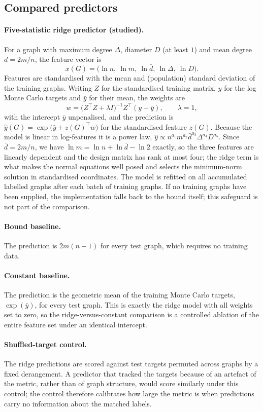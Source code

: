 \documentclass{article}
\begin{document}
\subsection{Compared predictors}
\paragraph{Five-statistic ridge predictor (studied).} For a graph with maximum degree $\Delta$, diameter $D$ (at least $1$) and mean degree $\bar d=2m/n$, the feature vector is
\[
x(G)=\big(\ln n,\ \ln m,\ \ln \bar d,\ \ln\Delta,\ \ln D\big).
\]
Features are standardised with the mean and (population) standard deviation of the training graphs. Writing $Z$ for the standardised training matrix, $y$ for the log Monte Carlo targets and $\bar y$ for their mean, the weights are
\[
w=\big(Z^\top Z+\lambda I\big)^{-1}Z^\top(y-\bar y),\qquad \lambda=1,
\]
with the intercept $\bar y$ unpenalised, and the prediction is $\hat y(G)=\exp\!\big(\bar y+z(G)^\top w\big)$ for the standardised feature $z(G)$. Because the model is linear in log-features it is a power law, $\hat y\propto n^{a_1}m^{a_2}\bar d^{a_3}\Delta^{a_4}D^{a_5}$. Since $\bar d=2m/n$, we have $\ln m=\ln n+\ln\bar d-\ln 2$ exactly, so the three features are linearly dependent and the design matrix has rank at most four; the ridge term is what makes the normal equations well posed and selects the minimum-norm solution in standardised coordinates. The model is refitted on all accumulated labelled graphs after each batch of training graphs. If no training graphs have been supplied, the implementation falls back to the bound itself; this safeguard is not part of the comparison.

\paragraph{Bound baseline.} The prediction is $2m(n-1)$ for every test graph, which requires no training data.

\paragraph{Constant baseline.} The prediction is the geometric mean of the training Monte Carlo targets, $\exp(\bar y)$, for every test graph. This is exactly the ridge model with all weights set to zero, so the ridge-versus-constant comparison is a controlled ablation of the entire feature set under an identical intercept.

\paragraph{Shuffled-target control.} The ridge predictions are scored against test targets permuted across graphs by a fixed derangement. A predictor that tracked the targets because of an artefact of the metric, rather than of graph structure, would score similarly under this control; the control therefore calibrates how large the metric is when predictions carry no information about the matched labels.
\end{document}
